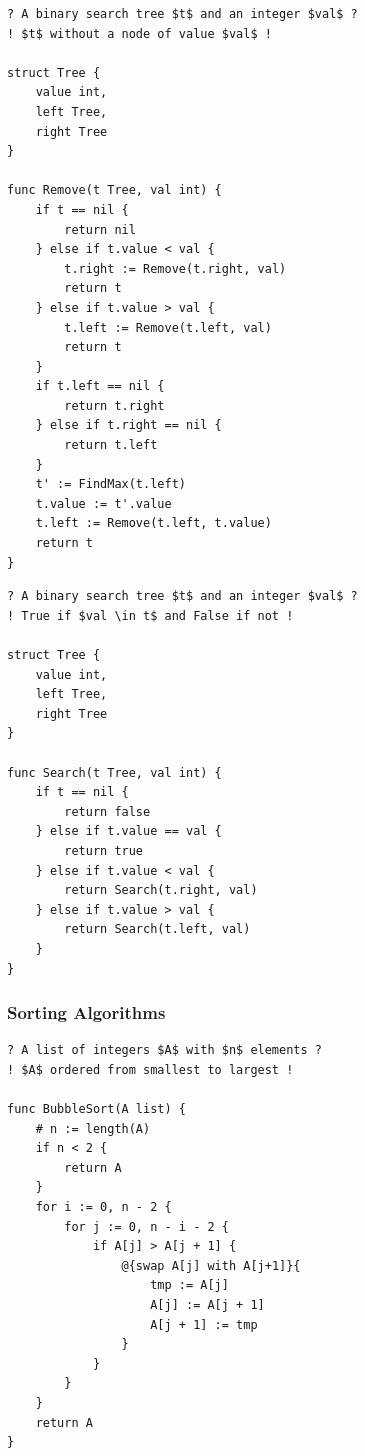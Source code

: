 \begin{lstlisting}[caption={The result of transpiling \Cref{removeGourmet} back to Gourmet.}, captionpos=b, label={removeGourmet2}]
? A binary search tree $t$ and an integer $val$ ?
! $t$ without a node of value $val$ !

struct Tree {
	value int,
	left Tree,
	right Tree
}

func Remove(t Tree, val int) {
	if t == nil {
		return nil
	} else if t.value < val {
		t.right := Remove(t.right, val)
		return t
	} else if t.value > val {
		t.left := Remove(t.left, val)
		return t
	}
	if t.left == nil {
		return t.right
	} else if t.right == nil {
		return t.left
	}
	t' := FindMax(t.left)
	t.value := t'.value
	t.left := Remove(t.left, t.value)
	return t
}
\end{lstlisting}

\begin{lstlisting}[caption={The result of transpiling \Cref{searchGourmet} back to Gourmet.}, captionpos=b, label={searchGourmet2}]
? A binary search tree $t$ and an integer $val$ ?
! True if $val \in t$ and False if not !

struct Tree {
    value int,
    left Tree,
    right Tree
}

func Search(t Tree, val int) {
    if t == nil {
        return false
    } else if t.value == val {
        return true
    } else if t.value < val {
        return Search(t.right, val)
    } else if t.value > val {
        return Search(t.left, val)
    }
}
\end{lstlisting}

\subsubsection{Sorting Algorithms}

\begin{lstlisting}[caption={The result of transpiling \Cref{bubbleSortGourmet} back to Gourmet.}, captionpos=b, label={bubbleSortGourmet2}]
? A list of integers $A$ with $n$ elements ?
! $A$ ordered from smallest to largest !

func BubbleSort(A list) {
    # n := length(A)
    if n < 2 {
        return A
    }
    for i := 0, n - 2 {
        for j := 0, n - i - 2 {
            if A[j] > A[j + 1] {
                @{swap A[j] with A[j+1]}{
                    tmp := A[j]
                    A[j] := A[j + 1]
                    A[j + 1] := tmp
                }
            }
        }
    }
    return A
}
\end{lstlisting}

